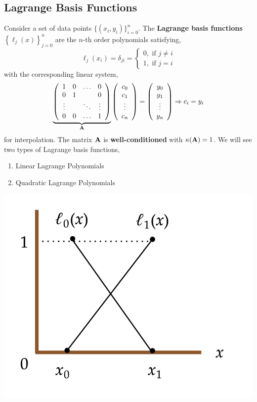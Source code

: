 \subsection{Lagrange Basis Functions}
Consider a set of data points $\{(x_i, y_i)\}_{i=0}^n$. The \textbf{Lagrange basis functions} $\left\{\ell_j(x)\right\}_{j=0}^n$ are the $n$-th order polynomials satisfying,
\[\ell_j\left(x_i\right)=\delta_{j i}=\left\{\begin{array}{l}
0, \text { if } j \neq i \\
1, \text { if } j=i
\end{array}\right.\]
with the corresponding linear system, \[\underbrace{\left(\begin{array}{cccc}
1 & 0 & \ldots & 0 \\
0 & 1 & & 0 \\
\vdots & & \ddots & \vdots \\
0 & 0 & \ldots & 1
\end{array}\right)}_{\mathbf{A}}\left(\begin{array}{c}
c_0 \\
c_1 \\
\vdots \\
c_n
\end{array}\right)=\left(\begin{array}{c}
y_0 \\
y_1 \\
\vdots \\
y_n
\end{array}\right) \Rightarrow c_i=y_i\]
for interpolation. The matrix $\mathbf{A}$ is \textbf{well-conditioned} with $\kappa(\mathbf{A}) = 1$. We will see two types of Lagrange basis functions,
\begin{enumerate}
    \item Linear Lagrange Polynomials
    \item Quadratic Lagrange Polynomials
\end{enumerate}

\begin{marginfigure}
    \begin{center}
    \includegraphics[width=\textwidth]{figures/fig-9.png}
    \end{center}
\end{marginfigure}

